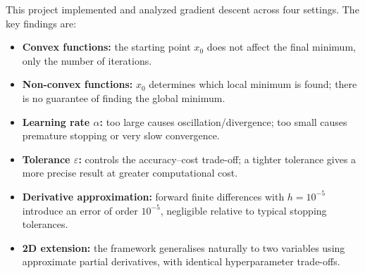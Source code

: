 \documentclass[11pt, letterpaper]{article}
\begin{document}
This project implemented and analyzed gradient descent across four settings.
The key findings are:

\begin{itemize}
  \item \textbf{Convex functions:} the starting point $x_0$ does not affect the
        final minimum, only the number of iterations.
  \item \textbf{Non-convex functions:} $x_0$ determines which local minimum is
        found; there is no guarantee of finding the global minimum.
  \item \textbf{Learning rate $\alpha$:} too large causes oscillation/divergence;
        too small causes premature stopping or very slow convergence.
  \item \textbf{Tolerance $\varepsilon$:} controls the accuracy–cost trade-off;
        a tighter tolerance gives a more precise result at greater computational cost.
  \item \textbf{Derivative approximation:} forward finite differences with
        $h=10^{-5}$ introduce an error of order $10^{-5}$, negligible relative
        to typical stopping tolerances.
  \item \textbf{2D extension:} the framework generalises naturally to two
        variables using approximate partial derivatives, with identical
        hyperparameter trade-offs.
\end{itemize}
\end{document}
